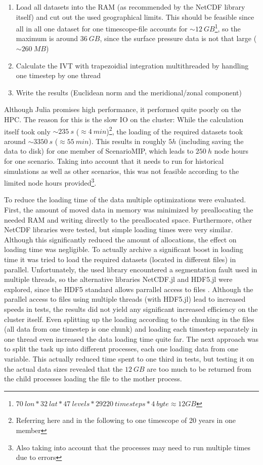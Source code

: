 \begin{enumerate}[itemsep=0mm]
  \item Load all datasets into the RAM (as recommended by the NetCDF library itself) and cut out the used geographical limits. This should be feasible since all in all one dataset for one timescope-file accounts for $\sim 12~GB$\footnote{$70~lon * 32~lat * 47~levels * 29220~timesteps * 4~byte \approx 12 GB$}, so the maximum is around $36~GB$, since the surface pressure data is not that large ($\sim 260~MB$)   
  \item Calculate the IVT with trapezoidial integration multithreaded by handling one time\-step by one thread
  \item Write the results (Euclidean norm and the meridional/zonal component)
\end{enumerate}

Although Julia promises high performance, it performed quite poorly on the HPC.
The reason for this is the slow IO on the cluster: While the calculation itself took only $\sim 235~s$ ($\approx 4~min$)\footnote{Referring here and  in the following to one timescope of 20 years in one member}, the loading of the required datasets took around $\sim 3350~s$ ($\approx 55~min$). 
This results in roughly $5 h$ (including saving the data to disk) for one member of ScenarioMIP, which leads to $250~h$ node hours for one scenario. 
Taking into account that it needs to run for historical simulations as well as other scenarios, this was not feasible according to the limited node hours provided\footnote{Also taking into account that the processes may need to run multiple times due to errors}.

To reduce the loading time of the data multiple optimizations were evaluated. 
First, the amount of moved data in memory was minimized by preallocating the needed RAM and writing directly to the preallocated space. 
Furthermore, other NetCDF libraries were tested, but simple loading times were very similar. 
Although this significantly reduced the amount of allocations, the effect on loading time was negligible. 
To actually archive a significant boost in loading time it was tried to load the required datasets (located in different files) in parallel. 
Unfortunately, the used library \cite{barth_ncdatasetsjl_2024} encountered a segmentation fault used in multiple threads, so the alternative libraries NetCDF.jl and HDF5.jl were explored, since the HDF5 standard allows parrallel access to files \cite{folk_overview_2011}. 
Although the parallel access to files using multiple threads (with HDF5.jl) lead to increased speeds in tests, the results did not yield any significant increased efficiency on the cluster itself.
Even splitting up the loading according to the chunking in the files (all data from one timestep is one chunk) and loading each timestep separately in one thread even increased the data loading time quite far.  
The next approach was to split the task up into different processes, each one loading data from one variable. This actually reduced time spent to one third in tests, but testing it on the actual data sizes revealed that the $12~GB$ are too much to be returned from the child processes loading the file to the mother process. 


